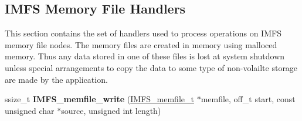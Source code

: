 \subsection*{I\+M\+FS Memory File Handlers}
\label{_amgrpbb903a78b6c5c9ed45328e55bbdabfd9}%
This section contains the set of handlers used to process operations on I\+M\+FS memory file nodes. The memory files are created in memory using malloc\textquotesingle{}ed memory. Thus any data stored in one of these files is lost at system shutdown unless special arrangements to copy the data to some type of non-\/volailte storage are made by the application. \begin{DoxyCompactItemize}
\item 
\mbox{\label{group__IMFS_gab9943fcab269e8f09a40063b45ee9584}} 
ssize\+\_\+t {\bfseries I\+M\+F\+S\+\_\+memfile\+\_\+write} (\mbox{\hyperlink{structIMFS__memfile__t}{I\+M\+F\+S\+\_\+memfile\+\_\+t}} $\ast$memfile, off\+\_\+t start, const unsigned char $\ast$source, unsigned int length)
\end{DoxyCompactItemize}
